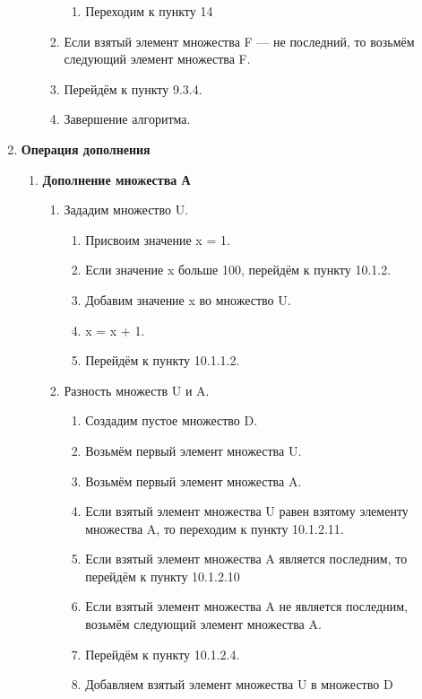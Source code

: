 \documentclass[a4paper,12pt]{extarticle}
\begin{document}
\begin{enumerate}
\begin{enumerate}[label*=\arabic*.]
\begin{enumerate}[label*=\arabic*.]
      \begin{enumerate}[label*=\arabic*.]
        \item Переходим к пункту 14
      \end{enumerate}
      \item Если взятый элемент множества F — не последний, то возьмём следующий элемент множества F.
      \item Перейдём к пункту 9.3.4.
      \item Завершение алгоритма.
    \end{enumerate}
  \end{enumerate}
  \item \textbf{Операция дополнения}
  \begin{enumerate}[label*=\arabic*.]
    \item \textbf{Дополнение множества А}
    \begin{enumerate}[label*=\arabic*.]
      \item Зададим множество U.
      \begin{enumerate}[label*=\arabic*.]
        \item Присвоим значение x = 1.
        \item Если значение x больше 100, перейдём к пункту 10.1.2.
        \item Добавим значение x во множество U.
        \item x = x + 1.
        \item Перейдём к пункту 10.1.1.2.
      \end{enumerate}
      \item Разность множеств U и A.
      \begin{enumerate}[label*=\arabic*.]
        \item Создадим пустое множество D.
        \item Возьмём первый элемент множества U.
        \item Возьмём первый элемент множества A.
        \item Если взятый элемент множества U равен взятому элементу множества A, то переходим к пункту 10.1.2.11.
        \item Если взятый элемент множества A является последним, то перейдём к пункту 10.1.2.10
        \item Если взятый элемент множества A не является последним, возьмём следующий элемент множества A.
        \item Перейдём к пункту 10.1.2.4.
        \item Добавляем взятый элемент множества U в множество D

\end{enumerate}
\end{enumerate}
\end{enumerate}
\end{enumerate}
\end{document}
